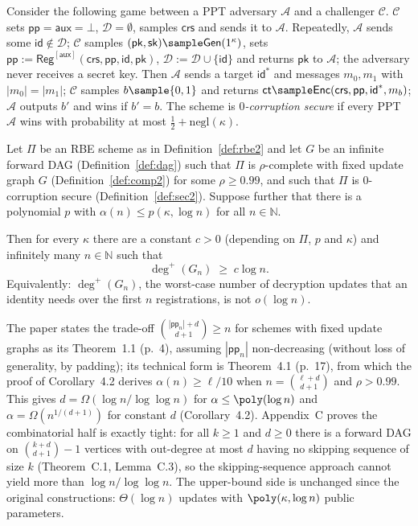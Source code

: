 \documentclass{conjura-conjecture}
\newcommand{\Gen}{\mathsf{Gen}}
\newcommand{\Reg}{\mathsf{Reg}}
\newcommand{\Enc}{\mathsf{Enc}}
\newcommand{\pp}{\mathsf{pp}}
\newcommand{\aux}{\mathsf{aux}}
\newcommand{\crs}{\mathsf{crs}}
\newcommand{\pk}{\mathsf{pk}}
\newcommand{\sk}{\mathsf{sk}}
\newcommand{\id}{\mathsf{id}}
\newcommand{\ct}{\mathsf{ct}}
\newcommand{\negl}{\mathrm{negl}}
\newcommand{\Nat}{\mathbb{N}}
\newcommand{\outdeg}{\deg^{+}}
\begin{document}
\begin{definition}\label{def:sec2}
Consider the following game between a PPT adversary $\mathcal{A}$ and a
challenger $\mathcal{C}$. $\mathcal{C}$ sets $\pp = \aux = \bot$,
$\mathcal{D} = \emptyset$, samples $\crs$ and sends it to $\mathcal{A}$.
Repeatedly, $\mathcal{A}$ sends some $\id \notin \mathcal{D}$;
$\mathcal{C}$ samples $(\pk,\sk) \sample \Gen(1^{\kappa})$, sets
$\pp := \Reg^{[\aux]}(\crs,\pp,\id,\pk)$,
$\mathcal{D} := \mathcal{D}\cup\{\id\}$ and returns $\pk$ to
$\mathcal{A}$; the adversary never receives a secret key. Then
$\mathcal{A}$ sends a target $\id^{*}$ and messages $m_0,m_1$ with
$|m_0| = |m_1|$; $\mathcal{C}$ samples $b \sample \{0,1\}$ and returns
$\ct \sample \Enc(\crs,\pp,\id^{*},m_b)$; $\mathcal{A}$ outputs $b'$ and
wins if $b' = b$. The scheme is \emph{$0$-corruption secure} if every
PPT $\mathcal{A}$ wins with probability at most
$\tfrac12 + \negl(\kappa)$.
\end{definition}

\begin{conjecture}\label{conj:main}
Let $\Pi$ be an RBE scheme as in Definition~\ref{def:rbe2} and let $G$
be an infinite forward DAG (Definition~\ref{def:dag}) such that $\Pi$ is
$\rho$-complete with fixed update graph $G$
(Definition~\ref{def:comp2}) for some $\rho \ge 0.99$, and such that
$\Pi$ is $0$-corruption secure (Definition~\ref{def:sec2}). Suppose
further that there is a polynomial $p$ with
$\alpha(n) \le p(\kappa,\log n)$ for all $n \in \Nat$.

Then for every $\kappa$ there are a constant $c > 0$ (depending on
$\Pi$, $p$ and $\kappa$) and infinitely many $n \in \Nat$ such that
\[
  \outdeg(G_n) \;\ge\; c \log n .
\]
Equivalently: $\outdeg(G_n)$, the worst-case number of decryption
updates that an identity needs over the first $n$ registrations, is not
$o(\log n)$.
\end{conjecture}

\begin{remark}\label{rem:progress}
The paper states the trade-off
$\binom{|\pp_n|+d}{d+1} \ge n$ for schemes with fixed update graphs as
its Theorem~1.1 (p.~4), assuming $|\pp_n|$ non-decreasing (without loss
of generality, by padding); its technical form is Theorem~4.1 (p.~17),
from which the proof of Corollary~4.2 derives $\alpha(n) \ge \ell/10$
when $n = \binom{\ell+d}{d+1}$ and $\rho > 0.99$. This gives
$d = \Omega(\log n/\log\log n)$ for $\alpha \le \poly(\log n)$ and
$\alpha = \Omega(n^{1/(d+1)})$ for constant $d$ (Corollary~4.2).
Appendix~C proves the combinatorial half is exactly tight: for all
$k \ge 1$ and $d \ge 0$ there is a forward DAG on
$\binom{k+d}{d+1} - 1$ vertices with out-degree at most $d$ having no
skipping sequence of size $k$ (Theorem~C.1, Lemma~C.3), so the
skipping-sequence approach cannot yield more than
$\log n/\log\log n$. The upper-bound side is unchanged since the
original constructions: $\Theta(\log n)$ updates with
$\poly(\kappa,\log n)$ public parameters.
\end{remark}
\end{document}
